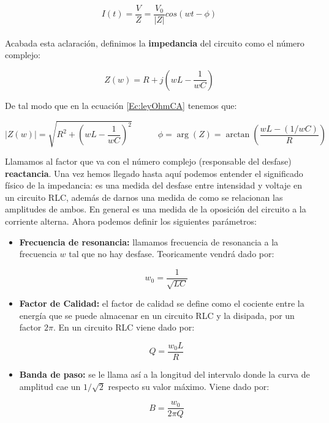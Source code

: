 \documentclass[12pt,a4paper]{article}
\newcommand{\parentesis}[1]{\left( #1  \right)}
\newcommand{\tquad}{\quad \quad \quad}
\begin{document}
\begin{equation}
I (t) = \dfrac{V}{Z} = \dfrac{V_0}{|Z|} cos(wt - \phi)
\end{equation} \\

Acabada esta aclaración, definimos la \textbf{impedancia} del circuito como el número complejo:

\begin{equation}
Z(w) = R + j \parentesis{ wL - \dfrac{1}{wC}}
\end{equation}

De tal modo que en la ecuación \ref{Ec:leyOhmCA} tenemos que:

\begin{equation}
|Z(w)| = \sqrt{R^2 + \parentesis{wL- \frac{1}{wC}}^2}  \tquad \phi = \arg(Z) = \arctan \parentesis{\dfrac{wL-(1/wC)}{R}} \label{Ec:z-y-arg(z)}
\end{equation}

Llamamos al factor que va con el número complejo (responsable del desfase)  \textbf{reactancia}. Una vez hemos llegado hasta aquí podemos entender el significado físico de la impedancia: es una medida del desfase entre intensidad y voltaje en un circuito RLC, además de darnos una medida de como se relacionan las amplitudes de ambos. En general es una medida de la oposición del circuito a la corriente alterna.  Ahora podemos definir los siguientes parámetros:

\begin{itemize}
\item \textbf{Frecuencia de resonancia:} llamamos frecuencia de resonancia a la frecuencia $w$ tal que no hay desfase. Teoricamente vendrá dado por:

\begin{equation}
w_0 = \dfrac{1}{\sqrt{LC}}
\end{equation}

\item \textbf{Factor de Calidad:} el factor de calidad se define como el cociente entre la energía que se puede almacenar en un circuito RLC y la disipada, por un factor $2 \pi$. En un circuito RLC viene dado por:

\begin{equation}
Q =  \dfrac{w_0 L}{R}
\end{equation}

\item \textbf{Banda de paso:} se le llama así a la longitud del intervalo donde la curva de amplitud cae un $1/\sqrt{2}$ respecto su valor máximo. Viene dado por:

\begin{equation}
B = \dfrac{w_0}{2 \pi Q}
\end{equation}
\end{itemize}
\end{document}
